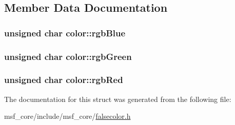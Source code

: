 \subsection{Member Data Documentation}
\hypertarget{structcolor_aafc5982901c82342e14ffa4051b4cc69}{
\subsubsection[{rgb\-Blue}]{\setlength{\rightskip}{0pt plus 5cm}unsigned char color\-::rgb\-Blue}}\label{structcolor_aafc5982901c82342e14ffa4051b4cc69}
\hypertarget{structcolor_acb9158eaf99c44902c7fb7b33cc4c55c}{
\subsubsection[{rgb\-Green}]{\setlength{\rightskip}{0pt plus 5cm}unsigned char color\-::rgb\-Green}}\label{structcolor_acb9158eaf99c44902c7fb7b33cc4c55c}
\hypertarget{structcolor_acbe14f26a6eb30162279a5309a77721d}{
\subsubsection[{rgb\-Red}]{\setlength{\rightskip}{0pt plus 5cm}unsigned char color\-::rgb\-Red}}\label{structcolor_acbe14f26a6eb30162279a5309a77721d}


The documentation for this struct was generated from the following file\-:\begin{DoxyCompactItemize}
\item 
msf\-\_\-core/include/msf\-\_\-core/\hyperlink{falsecolor_8h}{falsecolor.\-h}\end{DoxyCompactItemize}
